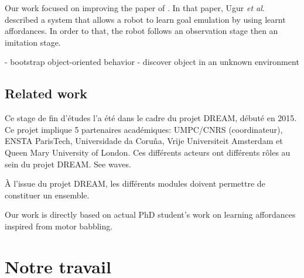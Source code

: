 \documentclass{llncs}
\begin{document}
Our work focused on improving the paper of \cite{Ugur2011}. In that paper, Ugur \textit{et al}.
described a system that allows a robot to learn goal emulation by using learnt affordances. In order to that, the robot follows an observation stage then an imitation stage.

- bootstrap object-oriented behavior
- discover object in an unknown environment




\subsection{Related work}

Ce stage de fin d'études l'a été dans le cadre du projet DREAM, débuté en 2015. Ce projet implique 5 partenaires académiques: UMPC/CNRS (coordinateur), ENSTA ParisTech, Universidade da Coruña, Vrije Universiteit Amsterdam et Queen Mary University of London. Ces différents acteurs ont différents rôles au sein du projet DREAM. See waves.

\`A l'issue du projet DREAM, les différents modules doivent permettre de constituer un ensemble. 

Our work is directly based on actual PhD student's work on learning affordances inspired from motor babbling.






\section{Notre travail}
\end{document}
